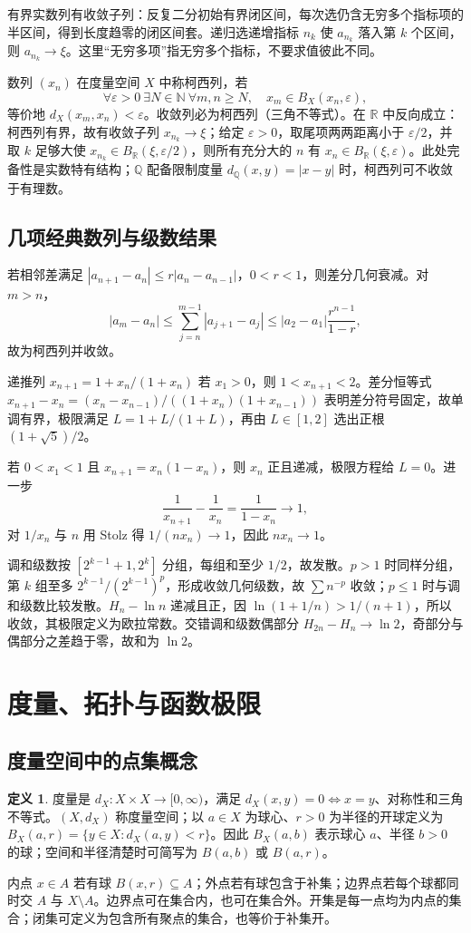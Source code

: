 \documentclass[11pt,a4paper,UTF8]{ctexart}
\theoremstyle{definition}\newtheorem{definition}[theorem]{定义}
\theoremstyle{remark}\newtheorem{remark}[theorem]{说明}
\begin{document}
有界实数列有收敛子列：反复二分初始有界闭区间，每次选仍含无穷多个指标项的半区间，得到长度趋零的闭区间套。递归选递增指标 $n_k$ 使 $a_{n_k}$ 落入第 $k$ 个区间，则 $a_{n_k}\to\xi$。这里“无穷多项”指无穷多个指标，不要求值彼此不同。

数列 $(x_n)$ 在度量空间 $X$ 中称柯西列，若
\[
\forall\varepsilon>0\ \exists N\in\mathbb N\ \forall m,n\ge N,\quad x_m\in B_X(x_n,\varepsilon),
\]
等价地 $d_X(x_m,x_n)<\varepsilon$。收敛列必为柯西列（三角不等式）。在 $\mathbb R$ 中反向成立：柯西列有界，故有收敛子列 $x_{n_k}\to\xi$；给定 $\varepsilon>0$，取尾项两两距离小于 $\varepsilon/2$，并取 $k$ 足够大使 $x_{n_k}\in B_{\mathbb R}(\xi,\varepsilon/2)$，则所有充分大的 $n$ 有 $x_n\in B_{\mathbb R}(\xi,\varepsilon)$。此处完备性是实数特有结构；$\mathbb Q$ 配备限制度量 $d_{\mathbb Q}(x,y)=|x-y|$ 时，柯西列可不收敛于有理数。

\subsection{几项经典数列与级数结果}
若相邻差满足 $|a_{n+1}-a_n|\le r|a_n-a_{n-1}|$，$0<r<1$，则差分几何衰减。对 $m>n$，
\[
|a_m-a_n|\le\sum_{j=n}^{m-1}|a_{j+1}-a_j|\le |a_2-a_1|\frac{r^{n-1}}{1-r},
\]
故为柯西列并收敛。

递推列 $x_{n+1}=1+x_n/(1+x_n)$ 若 $x_1>0$，则 $1<x_{n+1}<2$。差分恒等式 $x_{n+1}-x_n=(x_n-x_{n-1})/((1+x_n)(1+x_{n-1}))$ 表明差分符号固定，故单调有界，极限满足 $L=1+L/(1+L)$，再由 $L\in[1,2]$ 选出正根 $(1+\sqrt5)/2$。

若 $0<x_1<1$ 且 $x_{n+1}=x_n(1-x_n)$，则 $x_n$ 正且递减，极限方程给 $L=0$。进一步
\[
\frac1{x_{n+1}}-\frac1{x_n}=\frac1{1-x_n}\to1,
\]
对 $1/x_n$ 与 $n$ 用 Stolz 得 $1/(nx_n)\to1$，因此 $nx_n\to1$。

调和级数按 $[2^{k-1}+1,2^k]$ 分组，每组和至少 $1/2$，故发散。$p>1$ 时同样分组，第 $k$ 组至多 $2^{k-1}/(2^{k-1})^p$，形成收敛几何级数，故 $\sum n^{-p}$ 收敛；$p\le1$ 时与调和级数比较发散。$H_n-\ln n$ 递减且正，因 $\ln(1+1/n)>1/(n+1)$，所以收敛，其极限定义为欧拉常数。交错调和级数偶部分 $H_{2n}-H_n\to\ln2$，奇部分与偶部分之差趋于零，故和为 $\ln2$。

\section{度量、拓扑与函数极限}
\subsection{度量空间中的点集概念}
\begin{definition}
度量是 $d_X:X\times X\to[0,\infty)$，满足 $d_X(x,y)=0\iff x=y$、对称性和三角不等式。$(X,d_X)$ 称度量空间；以 $a\in X$ 为球心、$r>0$ 为半径的开球定义为 $B_X(a,r)=\{y\in X:d_X(a,y)<r\}$。因此 $B_X(a,b)$ 表示球心 $a$、半径 $b>0$ 的球；空间和半径清楚时可简写为 $B(a,b)$ 或 $B(a,r)$。
\end{definition}
内点 $x\in A$ 若有球 $B(x,r)\subseteq A$；外点若有球包含于补集；边界点若每个球都同时交 $A$ 与 $X\setminus A$。边界点可在集合内，也可在集合外。开集是每一点均为内点的集合；闭集可定义为包含所有聚点的集合，也等价于补集开。
\end{document}
